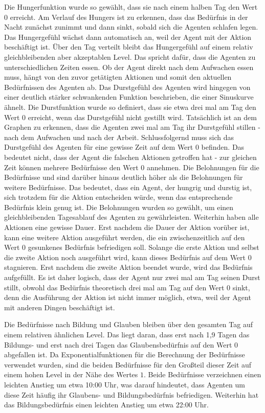 Die Hungerfunktion wurde so gewählt, dass sie nach einem halben Tag den Wert $0$ erreicht. Am Verlauf des Hungers ist zu erkennen, dass das Bedürfnis in der Nacht zunächst zunimmt und dann sinkt, sobald sich die Agenten schlafen legen. Das Hungergefühl wächst dann automatisch an, weil der Agent mit der Aktion  beschäftigt ist. Über den Tag verteilt bleibt das Hungergefühl auf einem relativ gleichbleibenden aber akzeptablen Level. Das spricht dafür, dass die Agenten zu unterschiedlichen Zeiten essen. Ob der Agent direkt nach dem Aufwachen essen muss, hängt von den zuvor getätigten Aktionen und somit den aktuellen Bedürfnissen des Agenten ab.
Das Durstgefühl des Agenten wird hingegen von einer deutlich stärker schwankenden Funktion beschrieben, die einer Sinuskurve ähnelt. Die Durstfunktion wurde so definiert, dass sie etwa drei mal am Tag den Wert $0$ erreicht, wenn das Durstgefühl nicht gestillt wird. Tatsächlich ist an dem Graphen zu erkennen, dass die Agenten zwei mal am Tag ihr Durstgefühl stillen - nach dem Aufwachen und nach der Arbeit. Schlussfolgernd muss sich das Durstgefühl des Agenten für eine gewisse Zeit auf dem Wert $0$ befinden. Das bedeutet nicht, dass der Agent die falschen Aktionen getroffen hat - zur gleichen Zeit können mehrere Bedürfnisse den Wert $0$ annehmen. Die Belohnungen für die Bedürfnisse  und  sind darüber hinaus deutlich höher als die Belohnungen für weitere Bedürfnisse. Das bedeutet, dass ein Agent, der hungrig und durstig ist, sich trotzdem für die Aktion  entscheiden würde, wenn das entsprechende Bedürfnis klein genug ist. Die Belohnungen wurden so gewählt, um einen gleichbleibenden Tagesablauf des Agenten zu gewährleisten. Weiterhin haben alle Aktionen eine gewisse Dauer. Erst nachdem die Dauer der Aktion vorüber ist, kann eine weitere Aktion ausgeführt werden, die ein zwischenzeitlich auf den Wert $0$ gesunkenes Bedürfnis befriedigen soll. Solange die erste Aktion und selbst die zweite Aktion noch ausgeführt wird, kann dieses Bedürfnis auf dem Wert $0$ stagnieren. Erst nachdem die zweite Aktion beendet wurde, wird das Bedürfnis aufgefüllt.
Es ist daher logisch, dass der Agent nur zwei mal am Tag seinen Durst stillt, obwohl das Bedürfnis theoretisch drei mal am Tag auf den Wert $0$ sinkt, denn die Ausführung der  Aktion ist nicht immer möglich, etwa, weil der Agent mit anderen Dingen beschäftigt ist.

Die Bedürfnisse nach Bildung und Glauben bleiben über den gesamten Tag auf einem relativen ähnlichen Level. Das liegt daran, dass erst nach 1,9 Tagen das Bildungs- und erst nach drei Tagen das Glaubensbedürfnis auf den Wert $0$ abgefallen ist. Da Exponentialfunktionen für die Berechnung der Bedürfnisse verwendet wurden, sind die beiden Bedürfnisse für den Großteil dieser Zeit auf einem hohen Level in der Nähe des Wertes $1$. Beide Bedürfnisse verzeichnen einen leichten Anstieg um etwa 10:00 Uhr, was darauf hindeutet, dass Agenten um diese Zeit häufig ihr Glaubens- und Bildungsbedürfnis befriedigen. Weiterhin hat das Bildungsbedürfnis einen leichten Anstieg um etwa 22:00 Uhr.

